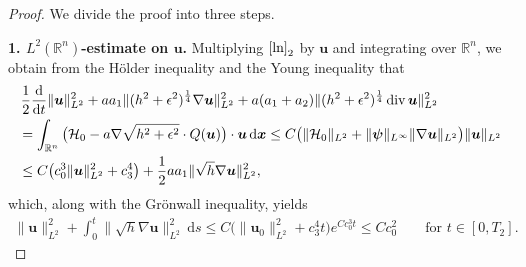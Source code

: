 \documentclass[11pt,reqno]{amsart}
\DeclareMathOperator{\diver}{\mathrm{div}}
\numberwithin{rk}{section}
\numberwithin{prop}{section}
\numberwithin{mydef}{section}
\numberwithin{lem}{section}
\numberwithin{equation}{section}
\numberwithin{thm}{section}
\begin{document}
\begin{proof}
We divide the proof into three steps.

\smallskip
\textbf{1. $L^2(\mathbb{R}^n)$-estimate on $\boldsymbol{u}$.}
Multiplying $\eqref{ln}_2$ by $\boldsymbol{u}$ and integrating over $\mathbb{R}^n$, we obtain from the H\"older inequality and the Young inequality that
\begin{align}
&\,\frac{1}{2}\frac{\mathrm{d}}{\mathrm{d}t}\|\boldsymbol{u}\|_{L^2}^2+aa_1\|(h^2+\epsilon^2)^{\frac{1}{4}}\nabla \boldsymbol{u}\|^2_{L^2}+a(a_1+a_2)\|(h^2+\epsilon^2)^{\frac{1}{4}}\diver \boldsymbol{u}\|^2_{L^2} \notag\\
& =\int_{\mathbb{R}^n} \big(\mathcal{H}_0
-a\nabla\sqrt{h^2+\epsilon^2}\cdot Q(\boldsymbol{u})\big)\cdot \boldsymbol{u}\,\mathrm{d}\boldsymbol{x}\leq C\big(\|\mathcal{H}_0\|_{L^2}+\|\boldsymbol{\psi}\|_{L^\infty}\|\nabla \boldsymbol{u}\|_{L^2}\big)\|\boldsymbol{u}\|_{L^2}\notag\\
&\leq C\big(c_0^{3}\|\boldsymbol{u}\|^2_{L^2}+c_3^4\big)+\frac{1}{2}a a_1\|\sqrt{h}\nabla \boldsymbol{u}\|^2_{L^2},\notag
\end{align}
which, along with the Gr\"onwall inequality, yields 
\begin{equation}\label{ul2}
\begin{aligned}
\|\boldsymbol{u}\|_{L^2}^2+\int^t_0\|\sqrt{h}\nabla \boldsymbol{u}\|^2_{L^2}\,\mathrm{d}s
\leq  C\big(\|\boldsymbol{u}_0\|_{L^2}^2+c_3^4t\big)e^{Cc_0^{3}t}\leq Cc^2_0\qquad \text{for $t\in [0,T_2]$}.
\end{aligned}
\end{equation}


\end{proof}
\end{document}
